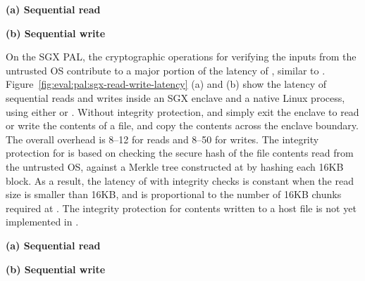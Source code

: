 \begin{figure*}[t!]
\centering
\footnotesize
{}
\parbox{0.49\textwidth}{\centering\bf (a) Sequential read}
\parbox{0.49\textwidth}{\centering\bf (b) Sequential write}
\caption{Latency of sequential  and  on the Linux PAL,
versus  and  on Linux.
Lower is better.
Figure (a) and (b) respectively compares  and  on the Linux PAL,
with and without a SECCOMP filter ({\bf +SC})
and reference monitor ({\bf +RM}), against  and  on Linux.}
\label{fig:eval:pal:read-write-latency}
\end{figure*}





On the SGX PAL, the cryptographic operations for verifying the inputs from the untrusted OS contribute
to a major portion of the latency of , similar to  . 
Figure~\ref{fig:eval:pal:sgx-read-write-latency} (a) and (b) show the latency of sequential reads and writes
inside an SGX enclave and a native Linux process,
using either \hostapis{} or \linuxapis{}.
Without integrity protection,
 and  simply exit the enclave
to read or write the contents of a file,
and copy the contents across the enclave boundary.
The overall overhead is 8--12 \usec{} for reads and 8--50 \usec{} for writes.
The integrity protection
for  is based on
checking the secure hash of the file contents read from the untrusted OS,
against a Merkle tree constructed at 
by hashing each 16KB block.
As a result, the latency of  with integrity checks is constant when the read size is smaller than 16KB, and is proportional to the number of 16KB chunks required at .
The integrity protection for contents written to a host file is not yet implemented in \graphenesgx{}.



\begin{figure*}[t!]
\centering
\footnotesize
{}
\parbox{0.49\textwidth}{\centering\bf (a) Sequential read}
\parbox{0.49\textwidth}{\centering\bf (b) Sequential write}
\caption{Latency of sequential  and  on the SGX PAL,
versus the Linux PAL and Linux.
Lower is better.
Figure (a) and (b) respectively compares  and  on the SGX PAL,
with and without integrity checks ({\bf +CHK})
and reference monitor ({\bf +RM}), against the Linux PAL and  and  on Linux. The current design does not support integrity checks for .}
\label{fig:eval:pal:sgx-read-write-latency}
\end{figure*}




